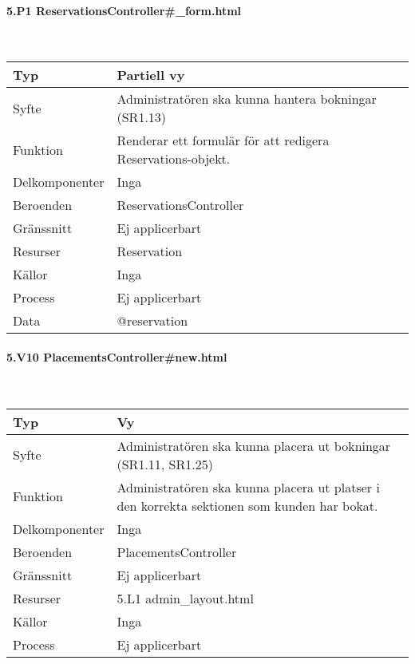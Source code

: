 \documentclass[a4paper, twoside, 11pt, titlepage]{article}
\begin{document}
			\paragraph{5.P1 ReservationsController\#\_form.html}\

			\begin {table} [ht] \begin{tabular} {  p{3.5cm} p{9.6cm} }
				\hline
				Typ & Partiell vy  \\
				\hline
				Syfte & Administratören ska kunna hantera bokningar (SR1.13)  \\
				\hline
				Funktion & Renderar ett formulär för att redigera Reservations-objekt.  \\
				\hline
				Delkomponenter & Inga  \\
				\hline
				Beroenden & ReservationsController  \\
				\hline
				Gränssnitt & Ej applicerbart  \\
				\hline
				Resurser & Reservation  \\
				\hline
				Källor & Inga  \\
				\hline
				Process & Ej applicerbart  \\
				\hline
				Data & @reservation  \\
				\hline
			\end{tabular} \end{table} \FloatBarrier


			\paragraph{5.V10 PlacementsController\#new.html}\

			\begin {table} [ht] \begin{tabular} {  p{3.5cm} p{9.6cm} }
				\hline
				Typ & Vy  \\
				\hline
				Syfte & Administratören ska kunna placera ut bokningar (SR1.11, SR1.25)  \\
				\hline
				Funktion & Administratören ska kunna placera ut platser i den korrekta sektionen som kunden har bokat.  \\
				\hline
				Delkomponenter & Inga  \\
				\hline
				Beroenden & PlacementsController  \\
				\hline
				Gränssnitt & Ej applicerbart  \\
				\hline
				Resurser & 5.L1 admin\_layout.html  \\
				\hline
				Källor & Inga  \\
				\hline
				Process & Ej applicerbart  \\
				\hline
			\end{tabular} \end{table} \FloatBarrier
			\vspace{6mm}
\end{document}
